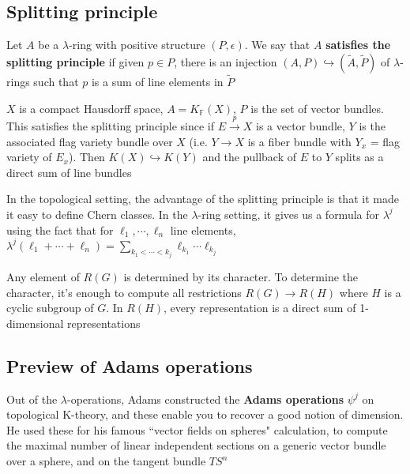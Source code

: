 \documentclass[main]{subfiles}
\begin{document}
\subsection{Splitting principle}

\begin{definition}
Let $A$ be a $\lambda$-ring with positive structure $(P,\epsilon)$. We say that $A$ \textbf{satisfies the splitting principle} if given $p\in P$, there is an injection $(A,P)\hookrightarrow(\tilde A,\tilde P)$ of $\lambda$-rings such that $p$ is a sum of line elements in $\tilde P$
\end{definition}

\begin{example}
$X$ is a compact Hausdorff space, $A=K_{\mathbb F}(X)$, $P$ is the set of vector bundles. This satisfies the splitting principle since if $E\xrightarrow pX$ is a vector bundle, $Y$ is the associated flag variety bundle over $X$ (i.e. $Y\to X$ is a fiber bundle with $Y_x$ = flag variety of $E_x$). Then $K(X)\hookrightarrow K(Y)$ and the pullback of $E$ to $Y$ splits as a direct sum of line bundles
\end{example}

In the topological setting, the advantage of the splitting principle is that it made it easy to define Chern classes. In the $\lambda$-ring setting, it gives us a formula for $\lambda^j$ using the fact that for $\ell_1,\cdots,\ell_n$ line elements, $\lambda^j(\ell_1+\cdots+\ell_n)=\sum_{k_1<\cdots<k_j}\ell_{k_1}\cdots \ell_{k_j}$

\begin{example}
Any element of $R(G)$ is determined by its character. To determine the character, it's enough to compute all restrictions $R(G)\to R(H)$ where $H$ is a cyclic subgroup of $G$. In $R(H)$, every representation is a direct sum of 1-dimensional representations
\end{example}

\subsection{Preview of Adams operations}

Out of the $\lambda$-operations, Adams constructed the \textbf{Adams operations} $\psi^j$ on topological K-theory, and these enable you to recover a good notion of dimension. He used these for his famous ``vector fields on spheres" calculation, to compute the maximal number of linear independent sections on a generic vector bundle over a sphere, and on the tangent bundle $TS^n$
\end{document}

